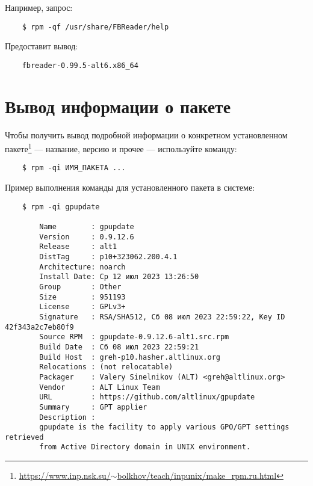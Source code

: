 Например, запрос:
\begin{verbatim}
    $ rpm -qf /usr/share/FBReader/help
\end{verbatim}
Предоставит вывод:
\begin{verbatim}
    fbreader-0.99.5-alt6.x86_64
\end{verbatim}

\section{Вывод информации о пакете}
Чтобы получить вывод подробной информации о конкретном установленном пакете\footnote{\href{https://www.inp.nsk.su/~bolkhov/teach/inpunix/make_rpm.ru.html}{https://www.inp.nsk.su/$\sim$bolkhov/teach/inpunix/make\_rpm.ru.html}} --- название, версию и прочее --- используйте команду:
\begin{verbatim}
    $ rpm -qi ИМЯ_ПАКЕТА ...
\end{verbatim}




Пример выполнения команды для установленного пакета в системе:
\begin{verbatim}
    $ rpm -qi gpupdate

        Name        : gpupdate
        Version     : 0.9.12.6
        Release     : alt1
        DistTag     : p10+323062.200.4.1
        Architecture: noarch
        Install Date: Ср 12 июл 2023 13:26:50
        Group       : Other
        Size        : 951193
        License     : GPLv3+
        Signature   : RSA/SHA512, Сб 08 июл 2023 22:59:22, Key ID 42f343a2c7eb80f9
        Source RPM  : gpupdate-0.9.12.6-alt1.src.rpm
        Build Date  : Сб 08 июл 2023 22:59:21
        Build Host  : greh-p10.hasher.altlinux.org
        Relocations : (not relocatable)
        Packager    : Valery Sinelnikov (ALT) <greh@altlinux.org>
        Vendor      : ALT Linux Team
        URL         : https://github.com/altlinux/gpupdate
        Summary     : GPT applier
        Description :
        gpupdate is the facility to apply various GPO/GPT settings retrieved
        from Active Directory domain in UNIX environment.
\end{verbatim}

